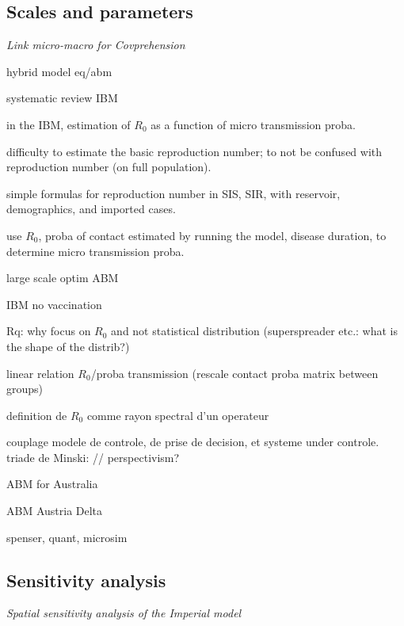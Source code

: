 \documentclass[10pt]{article}
\begin{document}
\subsection{Scales and parameters}

\textit{Link micro-macro for Covprehension}

\cite{hunter2020hybrid} hybrid model eq/abm

\cite{willem2017lessons} systematic review IBM

\cite{kuylen2017social} in the IBM, estimation of $R_0$ as a function of micro transmission proba.

\cite{delamater2019complexity} difficulty to estimate the basic reproduction number; to not be confused with reproduction number (on full population).

\cite{mclure2020some} simple formulas for reproduction number in SIS, SIR, with reservoir, demographics, and imported cases.

\cite{hunter2018open} use $R_0$, proba of contact estimated by running the model, disease duration, to determine micro transmission proba.

\cite{willem2015optimizing} large scale optim ABM  

\cite{kisjes2014individual} IBM no vaccination
	
Rq: why focus on $R_0$ and not statistical distribution (superspreader etc.: what is the shape of the distrib?)

\cite{chao2010flute} linear relation $R_0$/proba transmission (rescale contact proba matrix between groups)
	
\cite{bacaer2011parametre} definition de $R_0$ comme rayon spectral d'un operateur

\cite{bonte2011modelisation} couplage modele de controle, de prise de decision, et systeme under controle. triade de Minski: // perspectivism?

\cite{chang2020modelling} ABM for Australia

\cite{Nishi30285}

\cite{lasser2022assessing} ABM Austria Delta

\cite{spooner2021dynamic} spenser, quant, microsim


\subsection{Sensitivity analysis}

\textit{Spatial sensitivity analysis of the Imperial model}
\end{document}
